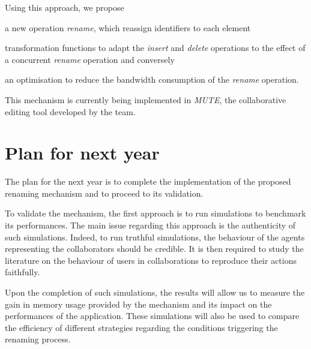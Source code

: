 \documentclass[11pt]{article}
\begin{document}
Using this approach, we propose
\begin{enumerate*}
    \item a new operation \emph{rename}, which reassign identifiers to each element
    \item transformation functions to adapt the \emph{insert} and \emph{delete} operations to the effect of a concurrent \emph{rename} operation and conversely
    \item an optimisation to reduce the bandwidth consumption of the \emph{rename} operation.
\end{enumerate*}

This mechanism is currently being implemented in \emph{MUTE}, the collaborative editing tool developed by the team.

\section*{Plan for next year}

\hspace{1em} The plan for the next year is to complete the implementation of the proposed renaming mechanism
and to proceed to its validation.


To validate the mechanism, the first approach is to run simulations to benchmark its performances.
The main issue regarding this approach is the authenticity of such simulations.
Indeed, to run truthful simulations, the behaviour of the agents representing the collaborators should be credible.
It is then required to study the literature on the behaviour of users in collaborations to reproduce their actions faithfully.

Upon the completion of such simulations, the results will allow us to measure the gain in memory usage provided by the mechanism
and its impact on the performances of the application.
These simulations will also be used to compare the efficiency of different strategies
regarding the conditions triggering the renaming process.

\end{document}
